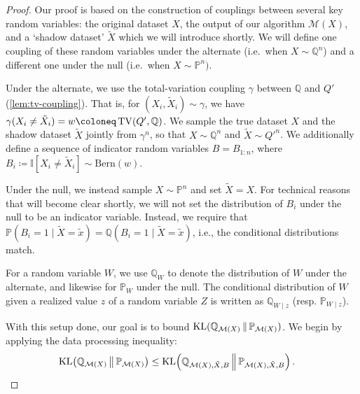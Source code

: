 \documentclass{article}
\DeclareMathOperator{\KLop}{KL}
\newcommand{\KL}[2]{%
  \mathchoice
    {\KLop\!\left(#1\,\middle\|\,#2\right)}%
    {\KLop(#1\,\Vert\,#2)}%
    {\KLop(#1\,\Vert\,#2)}%
    {\KLop(#1\,\Vert\,#2)}%
}
\DeclareMathOperator{\TVop}{TV}
\newcommand{\TV}[2]{
  \mathchoice
    {\TVop\!\left(#1,#2\right)}%
    {\TVop(#1,#2)}%
    {\TVop(#1,#2)}%
    {\TVop(#1,#2)}%
}
\newcommand{\Null}{\mathbb{P}}
\newcommand{\Alt}{\mathbb{Q}}
\newcommand{\M}{\mathcal{M}}
\begin{document}
\begin{proof}%
  Our proof is based on the construction of couplings between several key random variables: the original dataset $X$, the output of our algorithm $\M(X)$, and a `shadow dataset' $\tilde X$ which we will introduce shortly. We will define one coupling of these random variables under the alternate (i.e.\ when $X \sim \Alt^n$) and a different one under the null (i.e.\ when $X \sim \Null^n)$.
  
  Under the alternate, we use the total-variation coupling $\gamma$ between $\Alt$ and $Q'$ (\cref{lem:tv-coupling}). That is, for $(X_i, \tilde X_i) \sim \gamma$, we have $\gamma(X_i \neq \tilde X_i) = w \coloneq \TV{Q'}{\Alt}$. We sample the true dataset $X$ and the shadow dataset $\tilde X$ jointly from $\gamma^n$, so that $X \sim \Alt^n$ and $\tilde X \sim Q'^n$. We additionally define a sequence of indicator random variables $B = B_{1:n}$, where $B_i \coloneq \mathbb{I}[X_i \neq \tilde X_i] \sim \text{Bern}(w)$.
  
  Under the null, we instead sample $X\sim \Null^n$ and set $\tilde X = X$. For technical reasons that will become clear shortly, we will not set the distribution of $B_i$ under the null to be an indicator variable. Instead, we require that $\Null(B_i=1 \mid \tilde X=\tilde x) = \Alt(B_i = 1 \mid \tilde X=\tilde x)$, i.e., the conditional distributions match.

  For a random variable $W$,  we use $\Alt_W$ to denote the distribution of $W$ under the alternate, and likewise for $\Null_W$ under the null. The conditional distribution of $W$ given a realized value $z$ of a random variable $Z$ is written as $\Alt_{W\mid z}$ (resp. $\Null_{W \mid z}$).
  
  With this setup done, our goal is to bound $\KL{\Alt_{\M(X)}}{\Null_{\M(X)}}$. We begin by applying the data processing inequality:
\begin{align*}
    \KL{\Alt_{\M(X)}}{\Null_{\M(X)}} 
    &\leq \KL{\Alt_{\M(X),\tilde X, B}}{\Null_{\M(X), \tilde X, B}}.
\end{align*}


\end{proof}
\end{document}

